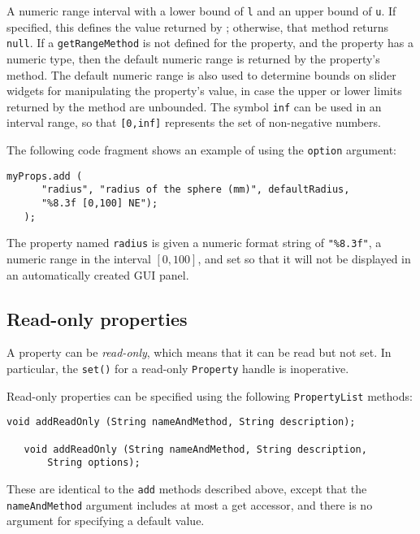\begin{description}
A numeric range interval with a lower bound of {\tt l} and an
upper bound of {\tt u}. If specified, this defines the value returned by
; 
otherwise, that method
returns {\tt null}. If a {\tt getRangeMethod} is not defined for the property,
and the property has a numeric type, then the default numeric range is
returned by the property's 
 method. The
default numeric range is also used to determine bounds on slider
widgets for manipulating the property's value, in case the upper or
lower limits returned by the 
 method are
unbounded.  The symbol {\tt inf} can be used in an interval range, so that
{\tt [0,inf]} represents the set of non-negative numbers.

\end{description}

The following code fragment shows an example of using the {\tt option}
argument:
\begin{lstlisting}[]
   myProps.add (
      "radius", "radius of the sphere (mm)", defaultRadius,
      "%8.3f [0,100] NE");
   );
\end{lstlisting}
The property named {\tt radius} is given a numeric format string of
{\tt "\%8.3f"}, a numeric range in the interval $[0, 100]$, and set so
that it will not be displayed in an automatically created GUI panel.

\subsection{Read-only properties}

A property can be {\it read-only}, which means that it can be read but
not set. In particular, the {\tt set()} for a read-only {\tt Property}
handle is inoperative.

Read-only properties can be specified using the following
{\tt PropertyList} methods:

\begin{lstlisting}[]
   void addReadOnly (String nameAndMethod, String description);

   void addReadOnly (String nameAndMethod, String description, 
       String options);
\end{lstlisting}
These are identical to the {\tt add} methods described above, except
that the {\tt nameAndMethod} argument includes at most a get accessor,
and there is no argument for specifying a default value.

